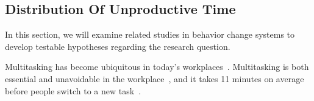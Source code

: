 \subsection{Distribution Of Unproductive Time}



In this section, we will examine related studies in behavior change systems to develop testable hypotheses regarding the research question. %


Multitasking has become ubiquitous in today's workplaces~\cite{Appelbaum2016, mark2015multitasking, CARRIER2009483}. Multitasking is both essential and unavoidable in the workplace~\cite{freedman2007, mark2008cost}, and it takes 11 minutes on average before people switch to a new task~\cite{dabbish2011keep}. 


